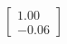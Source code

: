 \documentclass[preview]{standalone}
\begin{document}
\begin{align*}
\begin{bmatrix} 1.00 \\ -0.06 \end{bmatrix}
\end{align*}
\end{document}
